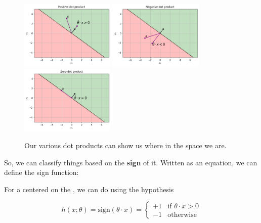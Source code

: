         \begin{figure}[H]
        
                \includegraphics[width=45mm,scale=0.3]{images/classification_images/positive_v_vector_theta_hat.png}
                \includegraphics[width=45mm,scale=0.3]{images/classification_images/negative_v_vector_theta_hat.png}
                \includegraphics[width=45mm,scale=0.3]{images/classification_images/zero_v_vector_theta_hat.png}
                
                \caption*{Our various dot products can show us where in the space we are.}
        \end{figure}        
        
        So, we can classify things based on the \textbf{sign} of it. Written as an equation, we can define the sign function:\\
        
        \begin{kequation}
            For a  centered on the , we can do  using the hypothesis
            
            \begin{equation*}
                h(x; \theta) = \text{sign}(\theta \cdot x )= 
                \begin{cases}
                    +1 & \text{if $\theta \cdot x > 0$} \\
                    -1 & \text{otherwise}
                \end{cases}
            \end{equation*}
        \end{kequation}